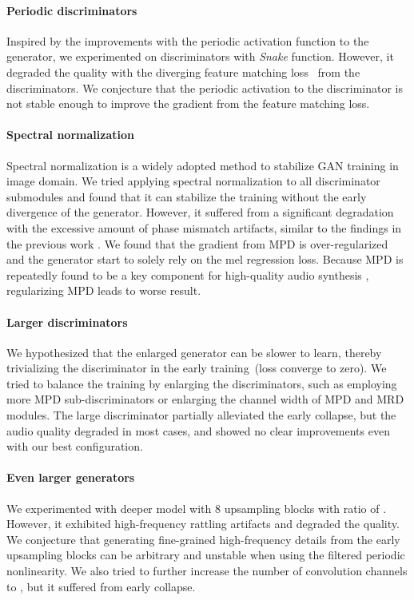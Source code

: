 \documentclass{article} \usepackage{iclr2023_conference,times}
\theoremstyle{plain}
\theoremstyle{definition}
\theoremstyle{remark}
\begin{document}
\paragraph{Periodic discriminators} Inspired by the improvements with the periodic activation function to the generator, we experimented on discriminators with \emph{Snake} function. However, it degraded the quality with the diverging feature matching loss~\citep{kong2020hifi} from the discriminators. We conjecture that the periodic activation to the discriminator is not stable enough to improve the gradient from the feature matching loss.
\paragraph{Spectral normalization} Spectral normalization \citep{miyato2018spectral} is a widely adopted method to stabilize GAN training in image domain. We tried applying spectral normalization to all discriminator submodules and found that it can stabilize the training without the early divergence of the generator. However, it suffered from a significant degradation with the excessive amount of phase mismatch artifacts, similar to the findings in the previous work \citep{kumar2019melgan}. We found that the gradient from MPD is over-regularized and the generator start to solely rely on the mel regression loss. Because MPD is repeatedly found to be a key component for high-quality audio synthesis \citep{kong2020hifi}, regularizing MPD leads to worse result.
\paragraph{Larger discriminators} We hypothesized that the enlarged generator can be slower to learn, thereby trivializing the discriminator in the early training~(loss converge to zero). We tried to balance the training by enlarging the discriminators, such as employing more MPD sub-discriminators or enlarging the channel width of MPD and MRD modules. The large discriminator partially alleviated the early collapse, but the audio quality degraded in most cases, and showed no clear improvements even with our best configuration.
\paragraph{Even larger generators} We experimented with deeper model with 8 upsampling blocks with ratio of . However, it exhibited high-frequency rattling artifacts and degraded the quality. We conjecture that generating fine-grained high-frequency details from the early upsampling blocks can be arbitrary \citep{karras2021alias} and unstable when using the filtered periodic nonlinearity. 
We also tried to further increase the number of convolution channels to , but it suffered from early collapse.
\end{document}
